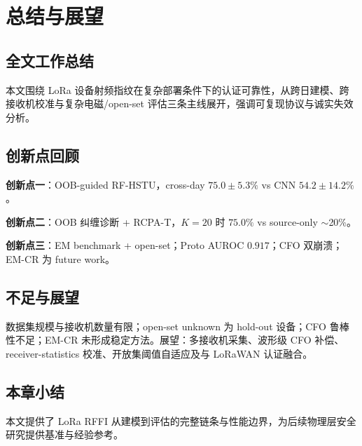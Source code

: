 \chapter{总结与展望}
\label{ch:conclusion}

\section{全文工作总结}

本文围绕 LoRa 设备射频指纹在复杂部署条件下的认证可靠性，从跨日建模、跨接收机校准与复杂电磁/open-set 评估三条主线展开，强调可复现协议与诚实失效分析。

\section{创新点回顾}

\textbf{创新点一}：OOB-guided RF-HSTU，cross-day $75.0\pm5.3\%$ vs CNN $54.2\pm14.2\%$。

\textbf{创新点二}：OOB 纠缠诊断 + RCPA-T，$K{=}20$ 时 $75.0\%$ vs source-only $\sim$20\%。

\textbf{创新点三}：EM benchmark + open-set；Proto AUROC $0.917$；CFO 双崩溃；EM-CR 为 future work。

\section{不足与展望}

数据集规模与接收机数量有限；open-set unknown 为 hold-out 设备；CFO 鲁棒性不足；EM-CR 未形成稳定方法。展望：多接收机采集、波形级 CFO 补偿、receiver-statistics 校准、开放集阈值自适应及与 LoRaWAN 认证融合。

\section{本章小结}

本文提供了 LoRa RFFI 从建模到评估的完整链条与性能边界，为后续物理层安全研究提供基准与经验参考。
